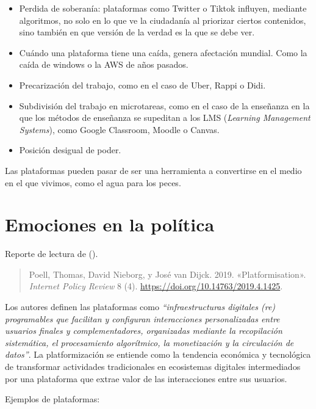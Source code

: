 \documentclass[
  letterpaper,
  DIV=11,
  numbers=noendperiod]{scrreprt}
\providecommand{\tightlist}{%
  \setlength{\itemsep}{0pt}\setlength{\parskip}{0pt}}\usepackage{longtable,booktabs,array}
\begin{document}
\begin{itemize}
\tightlist
\item
  Perdida de soberanía: plataformas como Twitter o Tiktok influyen,
  mediante algoritmos, no solo en lo que ve la ciudadanía al priorizar
  ciertos contenidos, sino también en que versión de la verdad es la que
  se debe ver.
\item
  Cuándo una plataforma tiene una caída, genera afectación mundial. Como
  la caída de windows o la AWS de años pasados.
\item
  Precarización del trabajo, como en el caso de Uber, Rappi o Didi.
\item
  Subdivisión del trabajo en microtareas, como en el caso de la
  enseñanza en la que los métodos de enseñanza se supeditan a los LMS
  (\emph{Learning Management Systems}), como Google Classroom, Moodle o
  Canvas.
\item
  Posición desigual de poder.
\end{itemize}

Las plataformas pueden pasar de ser una herramienta a convertirse en el
medio en el que vivimos, como el agua para los peces.

\chapter{Emociones en la política}\label{EmocionesNusbaum}

Reporte de lectura de ().

\begin{quote}
Poell, Thomas, David Nieborg, y José van Dijck. 2019. «Platformisation».
\emph{Internet Policy Review} 8 (4).
\url{https://doi.org/10.14763/2019.4.1425}.
\end{quote}

Los autores definen las plataformas como \emph{``infraestructuras
digitales (re) programables que facilitan y configuran interacciones
personalizadas entre usuarios finales y complementadores, organizadas
mediante la recopilación sistemática, el procesamiento algorítmico, la
monetización y la circulación de datos''}. La platformización se
entiende como la tendencia económica y tecnológica de transformar
actividades tradicionales en ecosistemas digitales intermediados por una
plataforma que extrae valor de las interacciones entre sus usuarios.

Ejemplos de plataformas:
\end{document}
